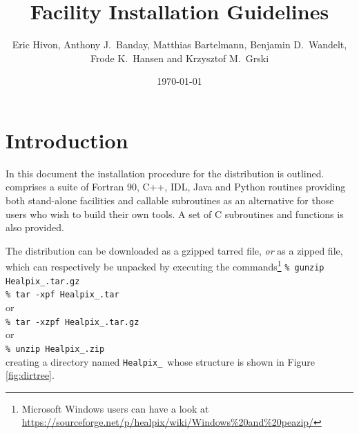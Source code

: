 \documentclass[12pt,twoside]{article}
\begin{document}
\title{\healpix Facility Installation Guidelines}
\author{Eric Hivon, Anthony J.~Banday, Matthias Bartelmann, Benjamin D.~Wandelt,
Frode K.~Hansen and Krzysztof M.~G{\oacute}rski}
%
\date{\today}

\frontpage
\tableofcontents
\newpage

\section{Introduction}

In this document the installation procedure for the \healpix
distribution is outlined. \healpix comprises a suite of Fortran 90, C++, 
IDL, Java and Python routines
providing both stand-alone facilities and callable subroutines as an alternative
for those users who wish to build their own tools.
A set of C subroutines and functions is also provided. 

The distribution can be downloaded as a gzipped tarred file, {\em or} as a zipped file,
which can respectively be unpacked by executing the commands\footnote{Microsoft Windows users can have a look at \\
\url{https://sourceforge.net/p/healpix/wiki/Windows\%20and\%20peazip/}} \hfill\newline
\texttt{\% gunzip Healpix\_\hpxversion.tar.gz}\hfill\\
\texttt{\% tar -xpf Healpix\_\hpxversion.tar}\hfill\\
or \hfill\\
\texttt{\% tar -xzpf Healpix\_\hpxversion.tar.gz}\hfill\\
or \hfill\\
\texttt{\% unzip Healpix\_\hpxversion.zip}\hfill\\
creating a directory named \texttt{Healpix\_\hpxversion}\ whose structure is shown in Figure
\ref{fig:dirtree}.
\end{document}

